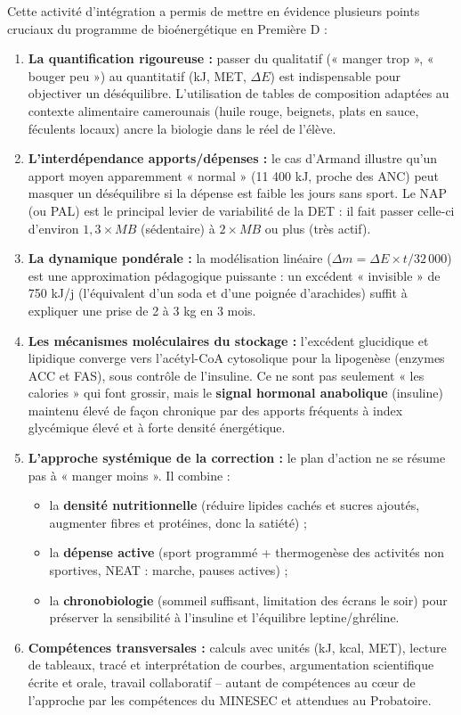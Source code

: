\documentclass[11pt]{article}
\newcommand{\cle}[1]{{\popxbold\color{popdark}#1}}
\newcounter{popsec}
\newcounter{popsub}
\newcommand{\courssub}[1]{%
  \stepcounter{popsub}%
  \par\vspace{9pt}\noindent{\popxbold\fontsize{11.5}{13}\selectfont\color{popink}{\color{poporange}\thepopsec.\thepopsub}\hspace{6pt}#1}\par\nopagebreak\vspace{4pt}
}
\begin{document}
\courssub{Bilan de l'activité}
\par
Cette activité d'intégration a permis de mettre en évidence plusieurs points cruciaux du programme de bioénergétique en Première D :
\begin{enumerate}
    \item \textbf{La quantification rigoureuse :} passer du qualitatif (« manger trop », « bouger peu ») au quantitatif (kJ, MET, $\Delta E$) est indispensable pour objectiver un déséquilibre. L'utilisation de tables de composition adaptées au contexte alimentaire camerounais (huile rouge, beignets, plats en sauce, féculents locaux) ancre la biologie dans le réel de l'élève.
    \item \textbf{L'interdépendance apports/dépenses :} le cas d'Armand illustre qu'un apport moyen apparemment « normal » (11 400 kJ, proche des ANC) peut masquer un déséquilibre si la dépense est faible les jours sans sport. Le \cle{NAP} (ou PAL) est le principal levier de variabilité de la DET : il fait passer celle-ci d'environ $1,3 \times MB$ (sédentaire) à $2 \times MB$ ou plus (très actif).
    \item \textbf{La dynamique pondérale :} la modélisation linéaire ($\Delta m = \Delta E \times t / 32\,000$) est une approximation pédagogique puissante : un excédent « invisible » de 750 kJ/j (l'équivalent d'un soda et d'une poignée d'arachides) suffit à expliquer une prise de 2 à 3 kg en 3 mois.
    \item \textbf{Les mécanismes moléculaires du stockage :} l'excédent glucidique et lipidique converge vers l'acétyl-CoA cytosolique pour la lipogenèse (enzymes ACC et FAS), sous contrôle de l'insuline. Ce ne sont pas seulement « les calories » qui font grossir, mais le \textbf{signal hormonal anabolique} (insuline) maintenu élevé de façon chronique par des apports fréquents à index glycémique élevé et à forte densité énergétique.
    \item \textbf{L'approche systémique de la correction :} le plan d'action ne se résume pas à « manger moins ». Il combine :
    \begin{itemize}
        \item la \textbf{densité nutritionnelle} (réduire lipides cachés et sucres ajoutés, augmenter fibres et protéines, donc la satiété) ;
        \item la \textbf{dépense active} (sport programmé + thermogenèse des activités non sportives, NEAT : marche, pauses actives) ;
        \item la \textbf{chronobiologie} (sommeil suffisant, limitation des écrans le soir) pour préserver la sensibilité à l'insuline et l'équilibre leptine/ghréline.
    \end{itemize}
    \item \textbf{Compétences transversales :} calculs avec unités (kJ, kcal, MET), lecture de tableaux, tracé et interprétation de courbes, argumentation scientifique écrite et orale, travail collaboratif -- autant de compétences au cœur de l'approche par les compétences du MINESEC et attendues au Probatoire.
\end{enumerate}
\end{document}
